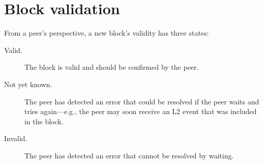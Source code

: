 \documentclass[../hydrozoa.tex]{subfiles}
\begin{document}


\section{Block validation}%
\label{h:l2-block-validation}%

From a peer's perspective, a new block's validity has three states:
\begin{description}
  \item[Valid.] The block is valid and should be confirmed by the peer.
  \item[Not yet known.] The peer has detected an error that could be resolved if the peer waits and tries again---e.g., the peer may soon receive an L2 event that was included in the block.
  \item[Invalid.] The peer has detected an error that cannot be resolved by waiting.
\end{description}
\end{document}
